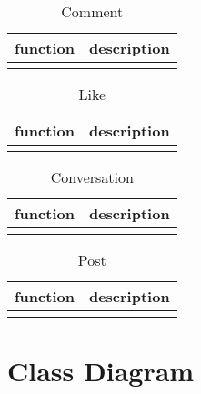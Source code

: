 \begin{table}[h]
    \centering
    \begin{tabular}{ll}
    function         & description\\ \hline
    & \\
    \end{tabular}
    \caption{Comment}
\end{table}

\begin{table}[h]
    \centering
    \begin{tabular}{ll}
    function         & description\\ \hline
    & \\
    \end{tabular}
    \caption{Like}
\end{table}

\begin{table}[h]
    \centering
    \begin{tabular}{ll}
    function         & description\\ \hline
    & \\
    \end{tabular}
    \caption{Conversation}
\end{table}

\begin{table}[h]
    \centering
    \begin{tabular}{ll}
    function         & description\\ \hline
    & \\
    \end{tabular}
    \caption{Post}
\end{table}

\section{Class Diagram}
